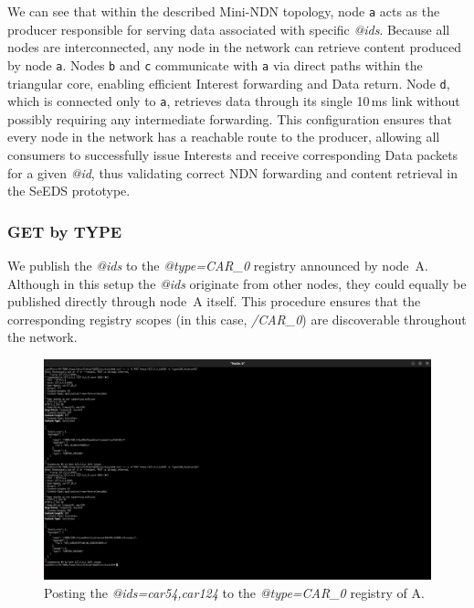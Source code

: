 \documentclass{article}
\begin{document}
We can see that within the described Mini-NDN topology, node \texttt{a} acts as the producer responsible for serving data associated with specific \textit{@ids}. Because all nodes are interconnected, any node in the network can retrieve content produced by node \texttt{a}. Nodes \texttt{b} and \texttt{c} communicate with \texttt{a} via direct paths within the triangular core, enabling efficient Interest forwarding and Data return. Node \texttt{d}, which is connected only to \texttt{a}, retrieves data through its single 10\,ms link without possibly requiring any intermediate forwarding. This configuration ensures that every node in the network has a reachable route to the producer, allowing all consumers to successfully issue Interests and receive corresponding Data packets for a given \textit{@id}, thus validating correct NDN forwarding and content retrieval in the SeEDS prototype.


\subsubsection{GET by TYPE}


We publish the \textit{@ids} to the \textit{@type=CAR\_0} registry announced by node~A. Although in this setup the \textit{@ids} originate from other nodes, they could equally be published directly through node~A itself. This procedure ensures that the corresponding registry scopes (in this case, \textit{/CAR\_0}) are discoverable throughout the network.

\begin{figure}[H]
    \centering
    \includegraphics[width=1\linewidth]{images/post_to_registry_b_a.png}
    \caption{Posting the \textit{@ids=car54,car124} to the \textit{@type=CAR\_0} registry of A.}
    \label{fig:post_to_registry_b_a}
\end{figure}
\end{document}
